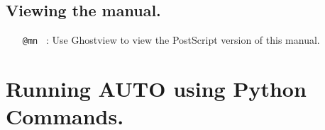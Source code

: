 \documentclass[12pt]{report}
\begin{document}
\section{ Viewing the manual.} 

\begin{itemize}

\item[\tt @mn]~: Use {\cal Ghostview} to view the PostScript version of this manual.
\end{itemize}

\newpage

\chapter{ Running {\cal AUTO} using Python Commands.} \label{sec:python_mode}

\end{document}
